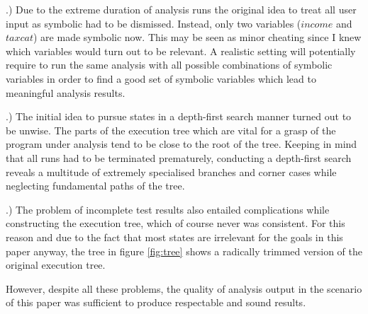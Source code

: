 .) Due to the extreme duration of analysis runs the original idea to treat all user input as symbolic had to be dismissed. Instead, only two variables ($income$ and $taxcat$) are made symbolic now.
This may be seen as minor cheating since I knew which variables would turn out to be relevant.
A realistic setting will potentially require to run the same analysis with all possible combinations of symbolic variables in order to find a good set of symbolic variables which lead to meaningful analysis results.

.) The initial idea to pursue states in a depth-first search manner turned out to be unwise.
The parts of the execution tree which are vital for a grasp of the program under analysis tend to be close to the root of the tree.
Keeping in mind that all \sse runs had to be terminated prematurely, conducting a depth-first search reveals a multitude of extremely specialised branches and corner cases while neglecting fundamental paths of the tree.

.) The problem of incomplete test results also entailed complications while constructing the execution tree, which of course never was consistent.
For this reason and due to the fact that most states are irrelevant for the goals in this paper anyway, the tree in figure \ref{fig:tree} shows a radically trimmed version of the original execution tree.

\medskip
However, despite all these problems, the quality of analysis output in the scenario of this paper was sufficient to produce respectable and sound results. 








\iffalse
§6	Interpretation of S2E analysis output
		> Execution Traces
		> Gefundene Privacy-Probleme
		> Eventuell nicht gefundene Sachen
		> Probleme bei der Analyse
\fi